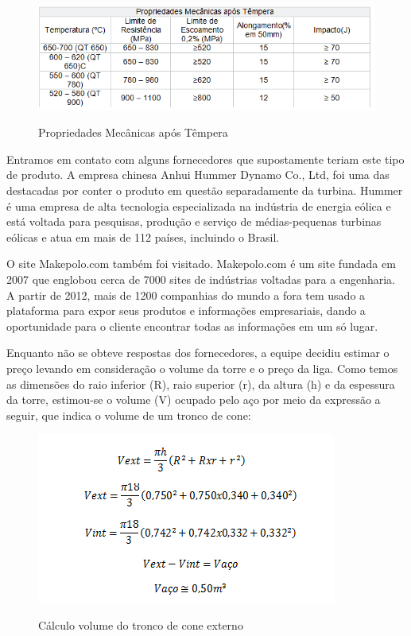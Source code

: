     \begin{figure}[!h]
    \centering
    \includegraphics[scale = 1]{editaveis/figuras/propriedade_mecanica_tempera}
    \label{propriedade_tempera}
    \caption[Propriedades Mecânicas após Têmpera]{Propriedades Mecânicas após Têmpera}
   \end{figure}
   \FloatBarrier

Entramos em contato com alguns fornecedores que supostamente teriam este tipo de produto. A empresa chinesa Anhui Hummer Dynamo Co., Ltd, foi uma das destacadas por conter o produto em questão separadamente da turbina. Hummer é uma empresa de alta tecnologia especializada na indústria de energia eólica e está voltada para pesquisas, produção e serviço de médias-pequenas turbinas eólicas e atua em mais de 112 países, incluindo o Brasil.\footnotemark
{}

O site Makepolo.com também foi visitado. Makepolo.com é um site fundada em 2007 que englobou cerca de 7000 sites de indústrias voltadas para a engenharia. A partir de 2012, mais de 1200 companhias do mundo a fora tem usado a plataforma para expor seus produtos e informações empresariais, dando a oportunidade para o cliente encontrar todas as informações em um só lugar.\footnotemark
 
Enquanto não se obteve respostas dos fornecedores, a equipe decidiu estimar o preço levando em consideração o volume da torre e o preço da liga. Como temos as dimensões do raio inferior (R), raio superior (r), da altura (h) e da espessura da torre, estimou-se o volume (V) ocupado pelo aço por meio da expressão a seguir,  que indica o volume de um tronco de cone: \footnotemark
{}
 \begin{figure}[!h]
    \centering
    \includegraphics[scale = 1]{editaveis/figuras/equacao_torre}
    \label{eq_torre}
    \caption[Cálculo volume do tronco de cone externo]{Cálculo volume do tronco de cone externo}
   \end{figure}
   \FloatBarrier
  
